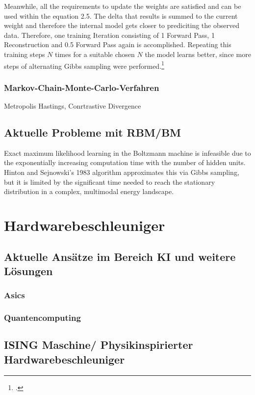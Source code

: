 Meanwhile, all the requirements to update the weights are satisfied and can be used within the equation 2.5. 
The delta that results is summed to the current weight and therefore the internal model gets closer to prediciting the observed data.
Therefore, one training Iteration consisting of 1 Forward Pass, 1 Reconstruction and 0.5 Forward Pass again is accomplished.
Repeating this training steps \( N \) times for a suitable chosen \( N \) the model learns better, since more steps of alternating Gibbs sampling were performed.\footcite[Vgl.][6]{huembeliPhysicsEnergybasedModels2022}




\subsubsection{Markov-Chain-Monte-Carlo-Verfahren}
Metropolis Hastings,
Conrtrastive Divergence

\subsection{Aktuelle Probleme mit RBM/BM}


Exact maximum likelihood learning in the Boltzmann machine is infeasible due to the exponentially increasing computation time with the number of hidden units.
Hinton and Sejnowski's 1983 algorithm approximates this via Gibbs sampling, but it is limited by the significant time needed to reach the stationary distribution in a complex, multimodal energy landscape.

\section{Hardwarebeschleuniger}
\subsection{Aktuelle Ansätze im Bereich KI und weitere Lösungen}
\subsubsection{Asics}
\subsubsection{Quantencomputing}
\subsection{ISING Maschine/ Physikinspirierter Hardwarebeschleuniger}

